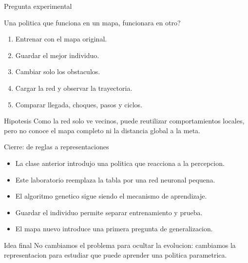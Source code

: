 \documentclass[aspectratio=169,11pt]{beamer}
\begin{document}
\begin{frame}{Pregunta experimental}
  \begin{center}
    \Large Una politica que funciona en un mapa, funcionara en otro?
  \end{center}
  \vspace{0.3cm}
  \begin{enumerate}
    \item Entrenar con el mapa original.
    \item Guardar el mejor individuo.
    \item Cambiar solo los obstaculos.
    \item Cargar la red y observar la trayectoria.
    \item Comparar llegada, choques, pasos y ciclos.
  \end{enumerate}
  \begin{alertblock}{Hipotesis}
    Como la red solo ve vecinos, puede reutilizar comportamientos locales, pero no conoce el mapa completo ni la distancia global a la meta.
  \end{alertblock}
\end{frame}

\begin{frame}{Cierre: de reglas a representaciones}
  \begin{itemize}
    \item La clase anterior introdujo una politica que reacciona a la percepcion.
    \item Este laboratorio reemplaza la tabla por una red neuronal pequena.
    \item El algoritmo genetico sigue siendo el mecanismo de aprendizaje.
    \item Guardar el individuo permite separar entrenamiento y prueba.
    \item El mapa nuevo introduce una primera pregunta de generalizacion.
  \end{itemize}
  \vspace{0.35cm}
  \begin{block}{Idea final}
    No cambiamos el problema para ocultar la evolucion: cambiamos la representacion para estudiar que puede aprender una politica parametrica.
  \end{block}
\end{frame}
\end{document}
